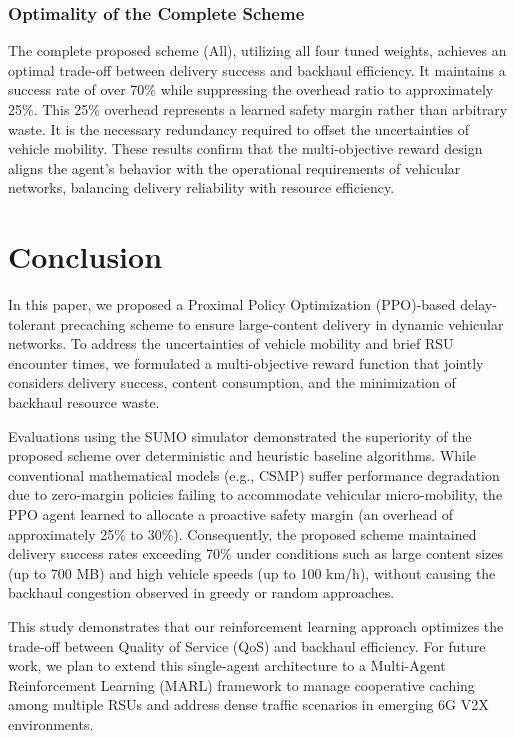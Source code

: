 \subsubsection{Optimality of the Complete Scheme}
The complete proposed scheme (All), utilizing all four tuned weights, achieves an optimal trade-off between delivery success and backhaul efficiency. It maintains a success rate of over 70\% while suppressing the overhead ratio to approximately 25\%. This 25\% overhead represents a learned safety margin rather than arbitrary waste. It is the necessary redundancy required to offset the uncertainties of vehicle mobility. These results confirm that the multi-objective reward design aligns the agent's behavior with the operational requirements of vehicular networks, balancing delivery reliability with resource efficiency.



\section{Conclusion}
\label{sec:conclusion}
In this paper, we proposed a Proximal Policy Optimization (PPO)-based delay-tolerant precaching scheme to ensure large-content delivery in dynamic vehicular networks. To address the uncertainties of vehicle mobility and brief RSU encounter times, we formulated a multi-objective reward function that jointly considers delivery success, content consumption, and the minimization of backhaul resource waste.

Evaluations using the SUMO simulator demonstrated the superiority of the proposed scheme over deterministic and heuristic baseline algorithms. While conventional mathematical models (e.g., CSMP) suffer performance degradation due to zero-margin policies failing to accommodate vehicular micro-mobility, the PPO agent learned to allocate a proactive safety margin (an overhead of approximately 25\% to 30\%). Consequently, the proposed scheme maintained delivery success rates exceeding 70\% under conditions such as large content sizes (up to 700 MB) and high vehicle speeds (up to 100 km/h), without causing the backhaul congestion observed in greedy or random approaches.

This study demonstrates that our reinforcement learning approach optimizes the trade-off between Quality of Service (QoS) and backhaul efficiency. For future work, we plan to extend this single-agent architecture to a Multi-Agent Reinforcement Learning (MARL) framework to manage cooperative caching among multiple RSUs and address dense traffic scenarios in emerging 6G V2X environments.

